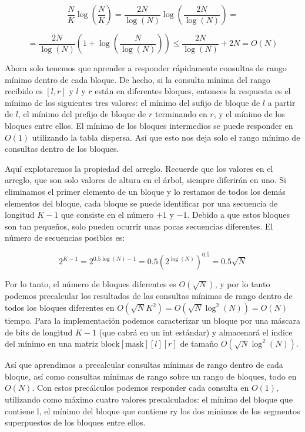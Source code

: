 $$ \frac{N}{K}\log\left(\frac{N}{K}\right) = \frac{2N}{\log(N)} \log\left(\frac{2N}{\log(N)}\right) =  $$

$$= \frac{2N}{\log(N)} \left(1 + \log\left(\frac{N}{\log(N)}\right)\right) \leq \frac{2N}{\log(N)} + 2N = O(N)$$

Ahora solo tenemos que aprender a responder rápidamente consultas de rango mínimo dentro de cada bloque. 
De hecho, si la consulta mínima del rango recibido es $[l, r]$ y $l$ y $r$ están en diferentes bloques, 
entonces la respuesta es el mínimo de los siguientes tres valores: el mínimo del sufijo de bloque de $l$ a 
partir de $l$, el mínimo del prefijo de bloque de $r$ terminando en $r$, y el mínimo de los bloques 
entre ellos. El mínimo de los bloques intermedios se puede responder en $O(1)$ utilizando la tabla 
dispersa. Así que esto nos deja solo el rango mínimo de consultas dentro de los bloques.

Aquí explotaremos la propiedad del arreglo. Recuerde que los valores en el arreglo, que son solo valores de altura en el árbol, siempre diferirán en uno. Si eliminamos el primer elemento de un bloque y lo restamos de todos los demás elementos del bloque, cada bloque se puede identificar por una secuencia de longitud $K-1$ que consiste en el número $+1$ y $-1$. Debido a que estos bloques son tan pequeños, solo pueden ocurrir unas pocas secuencias diferentes. El número de secuencias posibles es:

$$2^{K-1} = 2^{0.5 \log(N) - 1} = 0.5 \left(2^{\log(N)}\right)^{0.5} = 0.5 \sqrt{N}$$

Por lo tanto, el número de bloques diferentes es $O(\sqrt{N})$, y por lo tanto podemos precalcular los 
resultados de las consultas mínimas de rango dentro de todos los bloques diferentes en $O(\sqrt{N} K^2) = 
O(\sqrt{N} \log^2(N)) = O(N)$ tiempo. Para la implementación podemos caracterizar un bloque por una 
máscara de bits de longitud $K-1$ (que cabrá en un int estándar) y almacenará el índice del mínimo en una 
matriz $\text{block}[\text{mask}][l][r]$ de tamaño $O(\sqrt{N} \log^2(N))$.

Así que aprendimos a precalcular consultas mínimas de rango dentro de cada bloque, así como consultas mínimas de rango sobre un rango de bloques, todo en $O(N)$. Con estos precálculos podemos responder cada consulta en $O(1)$, utilizando como máximo cuatro valores precalculados: el mínimo del bloque que contiene l, el mínimo del bloque que contiene ry los dos mínimos de los segmentos superpuestos de los bloques entre ellos.